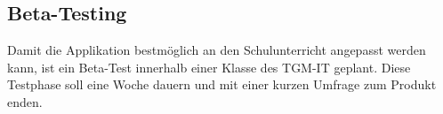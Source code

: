 \documentclass[12pt,a4paper,oneside,ngerman]{scrartcl}
\begin{document}
\subsection{Beta-Testing}
Damit die Applikation bestmöglich an den Schulunterricht angepasst werden kann, ist ein Beta-Test innerhalb einer Klasse des TGM-IT geplant. Diese Testphase soll eine Woche dauern und mit einer kurzen Umfrage zum Produkt enden.

\printglossary[numberedsection]




\end{document}
